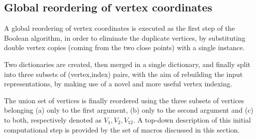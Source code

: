 \documentclass[11pt,oneside]{article}	%
\begin{document}
\subsection{Global reordering of vertex coordinates}
A global reordering of vertex coordinates is executed as the first step of the Boolean algorithm, in order to eliminate the duplicate vertices, by substituting double vertex copies (coming from the two close points) with a single instance. 

Two dictionaries are created, then merged in a single dictionary, and finally split into three subsets of (vertex,index) pairs, with the aim of rebuilding the input representations, by making use of a novel and more useful vertex indexing.

The union set of vertices is finally reordered using the three subsets of vertices belonging (a) only to the first argument, (b) only to the second argument and (c) to both, respectively denoted as $V_1, V_2, V_{12}$. A top-down description of this initial computational step is provided by the set of macros discussed in this section.
\end{document}
